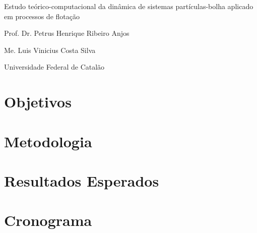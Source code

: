 \documentclass[12pt]{article}
\begin{document}
\begin{titlepage}
  \begin{center}
    \vspace*{1cm}
    \Huge{Estudo teórico-computacional da dinâmica de sistemas partículas-bolha aplicado em processos de flotação}

    \vspace{2cm}
    \Large{Prof. Dr. Petrus Henrique Ribeiro Anjos}

    \vspace{0.5cm}
    \Large{Me. Luis Vinicius Costa Silva}

    \vspace{0.5cm}
    \Large{Universidade Federal de Catalão}

  \end{center}
\end{titlepage}


\newpage
\tableofcontents %

\newpage
{} %
\doublespacing %

\section{Objetivos}
\section{Metodologia}

\section{Resultados Esperados}

\section{Cronograma}
\end{document}

